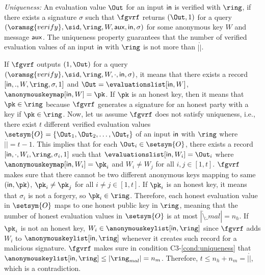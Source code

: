 	
	
\smallskip
	\noindent \textit{Uniqueness:} An evaluation value $ \Out $ for an input $ \mathsf{in} $  is verified with $ \ring $, if there exists a signature $ \sigma $ such that $ \fgvrf$ returns $ (\Out, 1)$ for a query $ (\oramsg{verify}, \sid, \ring,W,\aux,\msg,\sigma)$ for some anonymous key $ W $ and message $\mathsf{aux} $. The uniqueness property guarantees that the number of verified evaluation values of an input $ \mathsf{in} $ with $ \ring $ is not more than $ |\ring| $. 
	
	If $ \fgvrf $ outputs $ (1,\Out) $ for a query $ (\oramsg{verify}, \sid, \ring,W, \cdot,\msg,\sigma)$, it means that there exists a record $ [\msg, ., W,\ring, \sigma,1] $ and $ \Out = \evaluationslist[\msg, W] $, $ \anonymouskeymap[\msg, W]  = \pk$.  If $ \pk $ is an honest key, then it means that $ \pk \in \ring $ because $ \fgvrf $ generates a signature for an honest party with a key if $ \pk \in \ring $. Now,  let us assume $ \fgvrf $ does not satisfy uniqueness, i.e.,
	there exist $ t$ different verified evaluation values $ \setsym{O} = \{\Out_1, \Out_2, \ldots, \Out_t\} $ of an input $ \mathsf{in} $ with $ \ring $ where $ |\ring| = t-1 $. This implies that for each $ \Out_i \in \setsym{O} $, there exists a  record $ [\msg, \cdot, W_i,\ring,\sigma_i,1] $ such that  $\evaluationslist[\msg,W_i] = \Out_i $ where $ \anonymouskeymap[\msg,W_i] = \pk_i $ and $ W_i \neq W_j $ for all $ i,j \in [1,t] $. $ \fgvrf $ makes sure that there cannot be two different anonymous keys mapping to same $ (\msg, \pk) $,  $ \pk_i \neq \pk_j $ for all $ i \neq j \in [1,t] $.
	If $ \pk_i $ is an honest key, it means that $ \sigma_i $ is not a forgery, so $ \pk_i \in \ring $. Therefore, each honest evaluation value  in $ \setsym{O} $ maps to one honest public key in $ \ring $, meaning that the number of honest evaluation values in $ \setsym{O} $ is at most $ |\ring \setminus \ring_{mal}| = n_h $. If $ \pk_i $ is not an honest  key, $ W_i \in \anonymouskeylist[\msg,\ring] $ since $ \fgvrf $ adds $ W_i $ to $ \anonymouskeylist[\msg, \ring] $ whenever it creates such record for a malicious signature. $ \fgvrf $ makes sure in condition C3-\ref{cond:uniqueness} that $ \anonymouskeylist[\msg,\ring] \leq |\ring_{mal}| = n_m$. Therefore, $ t \leq n_h + n_m = |\ring| $, which is a contradiction.
	
